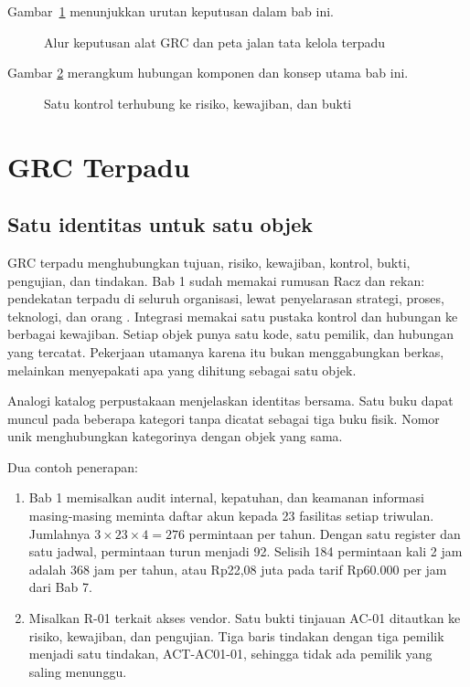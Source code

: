 Gambar~\ref{fig:ch14-alur} menunjukkan urutan keputusan dalam bab ini.

\begin{figure}[!htb]
  \centering
  
  \caption{Alur keputusan alat GRC dan peta jalan tata kelola terpadu}
  \label{fig:ch14-alur}
\end{figure}

Gambar \ref{fig:ch14-ilustrasi-bab} merangkum hubungan komponen dan konsep utama bab ini.
\begin{figure}[!htb]
  \centering
  
  \caption{Satu kontrol terhubung ke risiko, kewajiban, dan bukti}
  \label{fig:ch14-ilustrasi-bab}
\end{figure}

\section{GRC Terpadu}

\subsection*{Satu identitas untuk satu objek}

GRC terpadu menghubungkan tujuan, risiko, kewajiban, kontrol, bukti, pengujian, dan tindakan.
Bab 1 sudah memakai rumusan Racz dan rekan: pendekatan terpadu di seluruh organisasi, lewat
penyelarasan strategi, proses, teknologi, dan orang \cite{c01-racz2010}. Integrasi memakai satu
pustaka kontrol dan hubungan ke berbagai kewajiban. Setiap objek punya satu kode, satu pemilik,
dan hubungan yang tercatat. Pekerjaan utamanya karena itu bukan menggabungkan berkas, melainkan
menyepakati apa yang dihitung sebagai satu objek.

Analogi katalog perpustakaan menjelaskan identitas bersama. Satu buku dapat muncul pada beberapa
kategori tanpa dicatat sebagai tiga buku fisik. Nomor unik menghubungkan kategorinya dengan objek
yang sama.

Dua contoh penerapan:
\begin{enumerate}
  \item Bab 1 memisalkan audit internal, kepatuhan, dan keamanan informasi masing-masing meminta
  daftar akun kepada 23 fasilitas setiap triwulan. Jumlahnya $3 \times 23 \times 4 = 276$
  permintaan per tahun. Dengan satu register dan satu jadwal, permintaan turun menjadi 92.
  Selisih 184 permintaan kali 2 jam adalah 368 jam per tahun, atau Rp22,08 juta pada tarif
  Rp60.000 per jam dari Bab 7.
  \item Misalkan R-01 terkait akses vendor. Satu bukti tinjauan AC-01 ditautkan ke risiko,
  kewajiban, dan pengujian. Tiga baris tindakan dengan tiga pemilik menjadi satu tindakan,
  ACT-AC01-01, sehingga tidak ada pemilik yang saling menunggu.
\end{enumerate}

